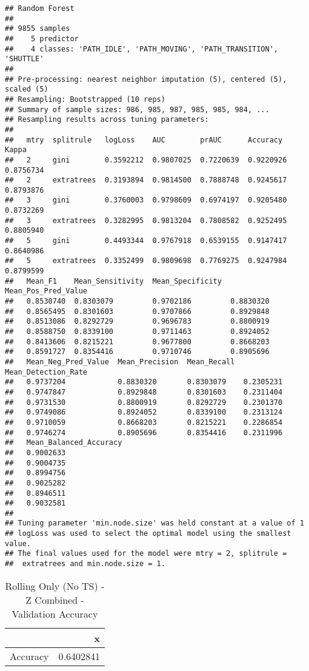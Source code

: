 \documentclass[]{article}
\begin{document}
\begin{verbatim}
## Random Forest 
## 
## 9855 samples
##    5 predictor
##    4 classes: 'PATH_IDLE', 'PATH_MOVING', 'PATH_TRANSITION', 'SHUTTLE' 
## 
## Pre-processing: nearest neighbor imputation (5), centered (5), scaled (5) 
## Resampling: Bootstrapped (10 reps) 
## Summary of sample sizes: 986, 985, 987, 985, 985, 984, ... 
## Resampling results across tuning parameters:
## 
##   mtry  splitrule   logLoss    AUC        prAUC      Accuracy   Kappa    
##   2     gini        0.3592212  0.9807025  0.7220639  0.9220926  0.8756734
##   2     extratrees  0.3193894  0.9814500  0.7888748  0.9245617  0.8793876
##   3     gini        0.3760003  0.9798609  0.6974197  0.9205480  0.8732269
##   3     extratrees  0.3282995  0.9813204  0.7808582  0.9252495  0.8805940
##   5     gini        0.4493344  0.9767918  0.6539155  0.9147417  0.8640986
##   5     extratrees  0.3352499  0.9809698  0.7769275  0.9247984  0.8799599
##   Mean_F1    Mean_Sensitivity  Mean_Specificity  Mean_Pos_Pred_Value
##   0.8530740  0.8303079         0.9702186         0.8830320          
##   0.8565495  0.8301603         0.9707866         0.8929848          
##   0.8513086  0.8292729         0.9696783         0.8800919          
##   0.8588750  0.8339100         0.9711463         0.8924052          
##   0.8413606  0.8215221         0.9677800         0.8668203          
##   0.8591727  0.8354416         0.9710746         0.8905696          
##   Mean_Neg_Pred_Value  Mean_Precision  Mean_Recall  Mean_Detection_Rate
##   0.9737204            0.8830320       0.8303079    0.2305231          
##   0.9747847            0.8929848       0.8301603    0.2311404          
##   0.9731530            0.8800919       0.8292729    0.2301370          
##   0.9749086            0.8924052       0.8339100    0.2313124          
##   0.9710059            0.8668203       0.8215221    0.2286854          
##   0.9746274            0.8905696       0.8354416    0.2311996          
##   Mean_Balanced_Accuracy
##   0.9002633             
##   0.9004735             
##   0.8994756             
##   0.9025282             
##   0.8946511             
##   0.9032581             
## 
## Tuning parameter 'min.node.size' was held constant at a value of 1
## logLoss was used to select the optimal model using the smallest value.
## The final values used for the model were mtry = 2, splitrule =
##  extratrees and min.node.size = 1.
\end{verbatim}

\begin{table}[!h]

\caption{\label{tab:sensor-z-combined-rolling-only-no-ts-rf-results}Rolling Only (No TS) - Z Combined - Validation Accuracy}
\centering
\begin{tabular}[t]{lr}
\toprule
  & x\\
\midrule
Accuracy & 0.6402841\\
\bottomrule
\end{tabular}
\end{table}
\end{document}
